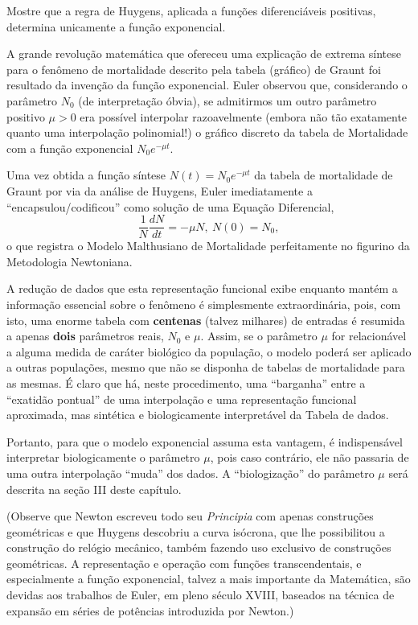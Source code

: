 \begin{exercise}
Mostre que a regra de Huygens, aplicada a funções diferenciáveis positivas, determina unicamente a função exponencial.
\end{exercise}

    A grande revolução matemática que ofereceu uma explicação de extrema síntese para o fenômeno de mortalidade descrito pela tabela (gráfico) de Graunt foi resultado da invenção da função exponencial. Euler observou que, considerando o parâmetro \(N_0\) (de interpretação óbvia), se admitirmos um outro parâmetro positivo \(\mu > 0\) era possível interpolar razoavelmente (embora não tão exatamente quanto uma interpolação polinomial!) o gráfico discreto da tabela de Mortalidade com a função exponencial \(N_0 e^{-\mu t}\).

    Uma vez obtida a função síntese \(N(t) = N_0 e^{-\mu t}\) da tabela de mortalidade de Graunt por via da análise de Huygens, Euler imediatamente a ``encapsulou/codificou'' como solução de uma Equação Diferencial,
    \[\dfrac{1}{N} \dfrac{dN}{dt} = -\mu N,\ N(0)=N_0,\]
    o que registra o Modelo Malthusiano de Mortalidade perfeitamente no figurino da Metodologia Newtoniana.

    A redução de dados que esta representação funcional exibe enquanto mantém a informação essencial sobre o fenômeno é simplesmente extraordinária, pois, com isto, uma enorme tabela com \textbf{centenas} (talvez milhares) de entradas é resumida a apenas \textbf{dois} parâmetros reais, \(N_0\) e \(\mu\). Assim, se o parâmetro \(\mu\) for relacionável a alguma medida de caráter biológico da população, o modelo poderá ser aplicado a outras populações, mesmo que não se disponha de tabelas de mortalidade para as mesmas. É claro que há, neste procedimento, uma ``barganha'' entre a ``exatidão pontual'' de uma interpolação e uma representação funcional aproximada, mas sintética e biologicamente interpretável da Tabela de dados.

    Portanto, para que o modelo exponencial assuma esta vantagem, é indispensável interpretar biologicamente o parâmetro \(\mu\), pois caso contrário, ele não passaria de uma outra interpolação ``muda'' dos dados. A ``biologização'' do parâmetro \(\mu\) será descrita na seção III deste capítulo.
    
    (Observe que Newton escreveu todo seu \textit{Principia} com apenas construções geométricas e que Huygens descobriu a curva isócrona, que lhe possibilitou a construção do relógio mecânico, também fazendo uso exclusivo de construções geométricas. A representação e operação com funções transcendentais, e especialmente a função exponencial, talvez a mais importante da Matemática, são devidas aos trabalhos de Euler, em pleno século XVIII, baseados na técnica de expansão em séries de potências introduzida por Newton.)


